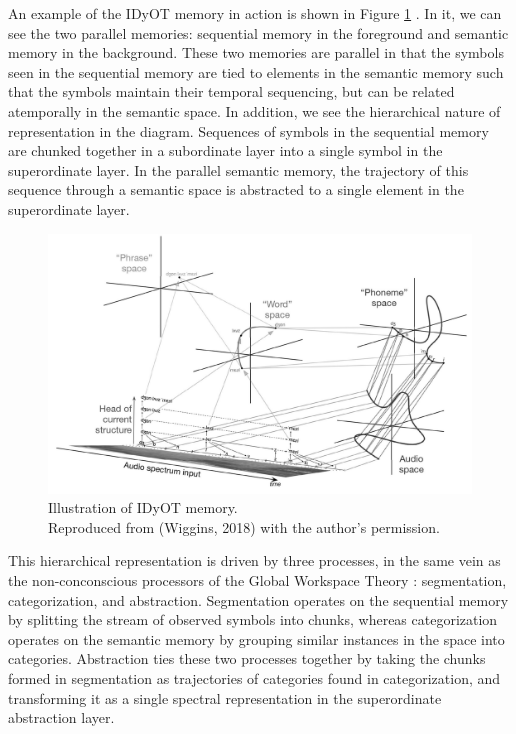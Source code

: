 An example of the IDyOT memory in action is shown in Figure \ref{figure:idyot-memory} \citep{wiggins2018creativity}.  In it, we can see the two parallel memories: sequential memory in the foreground and semantic memory in the background.  These two memories are parallel in that the symbols seen in the sequential memory are tied to elements in the semantic memory such that the symbols maintain their temporal sequencing, but can be related atemporally in the semantic space.  In addition, we see the hierarchical nature of representation in the diagram.  Sequences of symbols in the sequential memory are chunked together in a subordinate layer into a single symbol in the superordinate layer.  In the parallel semantic memory, the trajectory of this sequence through a semantic space is abstracted to a single element in the superordinate layer.

\begin{figure}
  \centering
  \includegraphics[width=\linewidth]{fig/idyot-memory-bw.png}
  \caption{Illustration of IDyOT memory.\\ Reproduced from (Wiggins, 2018) with the author's permission.}
  \label{figure:idyot-memory}
\end{figure}

This hierarchical representation is driven by three processes, in the same vein as the non-conconscious processors of the Global Workspace Theory \citep{baars1993cognitive}: segmentation, categorization, and abstraction.  Segmentation operates on the sequential memory by splitting the stream of observed symbols into chunks, whereas categorization operates on the semantic memory by grouping similar instances in the space into categories.  Abstraction ties these two processes together by taking the chunks formed in segmentation as trajectories of categories found in categorization, and transforming it as a single spectral representation in the superordinate abstraction layer.

